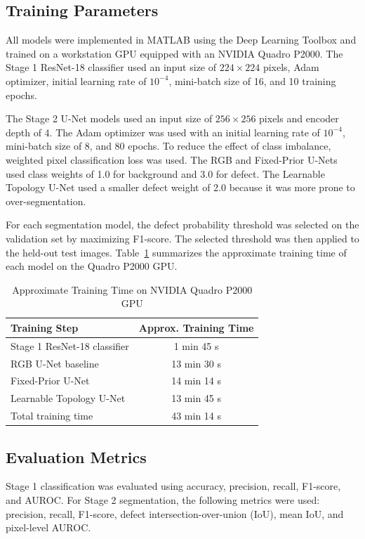 \documentclass[conference,a4paper]{IEEEtran}
\begin{document}
\subsection{Training Parameters}

All models were implemented in MATLAB using the Deep Learning Toolbox and trained on a workstation GPU equipped with an NVIDIA Quadro P2000. The Stage 1 ResNet-18 classifier used an input size of $224 \times 224$ pixels, Adam optimizer, initial learning rate of $10^{-4}$, mini-batch size of 16, and 10 training epochs.

The Stage 2 U-Net models used an input size of $256 \times 256$ pixels and encoder depth of 4. The Adam optimizer was used with an initial learning rate of $10^{-4}$, mini-batch size of 8, and 80 epochs. To reduce the effect of class imbalance, weighted pixel classification loss was used. The RGB and Fixed-Prior U-Nets used class weights of 1.0 for background and 3.0 for defect. The Learnable Topology U-Net used a smaller defect weight of 2.0 because it was more prone to over-segmentation.

For each segmentation model, the defect probability threshold was selected on the validation set by maximizing F1-score. The selected threshold was then applied to the held-out test images. Table~\ref{tab:trainingtime} summarizes the approximate training time of each model on the Quadro P2000 GPU.

\begin{table}[!t]
\centering
\caption{Approximate Training Time on NVIDIA Quadro P2000 GPU}
\label{tab:trainingtime}
\begin{tabular}{lc}
\toprule
Training Step & Approx. Training Time \\
\midrule
Stage 1 ResNet-18 classifier & 1 min 45 s \\
RGB U-Net baseline & 13 min 30 s \\
Fixed-Prior U-Net & 14 min 14 s \\
Learnable Topology U-Net & 13 min 45 s \\
\midrule
Total training time & 43 min 14 s \\
\bottomrule
\end{tabular}
\end{table}

\subsection{Evaluation Metrics}

Stage 1 classification was evaluated using accuracy, precision, recall, F1-score, and AUROC. For Stage 2 segmentation, the following metrics were used: precision, recall, F1-score, defect intersection-over-union (IoU), mean IoU, and pixel-level AUROC.
\end{document}

